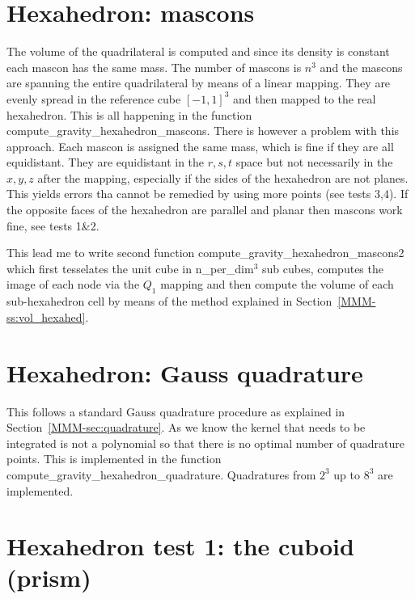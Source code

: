 \section*{Hexahedron: mascons}

The volume of the quadrilateral is computed and since its density is 
constant each mascon has the same mass. 
The number of mascons is $n^3$ and the mascons are spanning the entire 
quadrilateral by means of a linear mapping. They are evenly spread in the 
reference cube $[-1,1]^3$ and then mapped to the real hexahedron.
This is all happening in the function {\python compute\_gravity\_hexahedron\_mascons}.
There is however a problem with this approach. Each mascon is assigned the same mass, 
which is fine if they are all equidistant. They are equidistant in the $r,s,t$ space
but not necessarily in the $x,y,z$ after the mapping, especially if the sides of the 
hexahedron are not planes. This yields errors tha cannot be remedied by using 
more points (see tests 3,4). If the opposite faces of the hexahedron are  
parallel and planar then mascons work fine, see tests 1\&2.

This lead me to write second function {\python compute\_gravity\_hexahedron\_mascons2}
which first tesselates the unit cube in {\python n\_per\_dim}$^3$ sub cubes, 
computes the image of each node via the $Q_1$ mapping and then compute the volume
of each sub-hexahedron cell by means of the method explained in 
Section~\ref{MMM-ss:vol_hexahed}.

\section*{Hexahedron: Gauss quadrature}

This follows a standard Gauss quadrature procedure as explained
in Section~\ref{MMM-sec:quadrature}. As we know the 
kernel that needs to be integrated is not a polynomial so that 
there is no optimal number of quadrature points. 
This is implemented in the function {\python compute\_gravity\_hexahedron\_quadrature}.
Quadratures from $2^3$ up to $8^3$ are implemented.

\section*{Hexahedron test 1: the cuboid (prism)}

